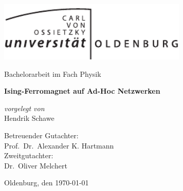 \begin{titlepage}
\begin{center}

\includegraphics[width=90mm]{images/Uniol_1c.pdf}\\
\vspace{25mm}

{\LARGE  Bachelorarbeit im Fach Physik\\}

\vspace{10mm}

{\LARGE \bfseries
Ising-Ferromagnet auf Ad-Hoc Netzwerken
\\}

\vspace{20mm}

\begin{minipage}{0.4\textwidth}
\begin{center} \large
\emph{vorgelegt von}\\
\large
Hendrik Schawe\\
\end{center}
\end{minipage}

\vspace{45mm}

{\large
Betreuender Gutachter:\\
Prof.\ Dr.\ Alexander K. Hartmann\\
}
\vspace{8mm}
{\large
Zweitgutachter:\\
Dr.\ Oliver Melchert\\
}

\vfill
{\large Oldenburg, den \today}
\newpage

\end{center}

\end{titlepage}
